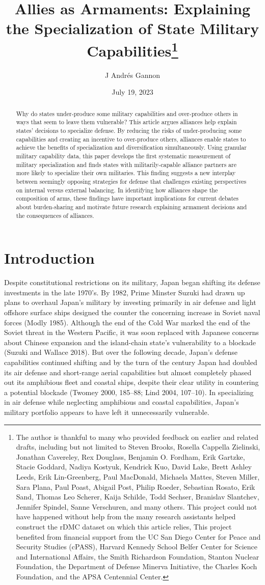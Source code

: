 \documentclass[
  12,
  letterpaper,
  DIV=11,
  numbers=noendperiod]{scrartcl}
\title{Allies as Armaments: Explaining the Specialization of State
Military Capabilities\thanks{The author is thankful to many who provided
feedback on earlier and related drafts, including but not limited to
Steven Brooks, Rosella Cappella Zielinski, Jonathan Cavereley, Rex
Douglass, Benjamin O. Fordham, Erik Gartzke, Stacie Goddard, Nadiya
Kostyuk, Kendrick Kuo, David Lake, Brett Ashley Leeds, Erik
Lin-Greenberg, Paul MacDonald, Michaela Mattes, Steven Miller, Sara
Plana, Paul Poast, Abigail Post, Philip Roeder, Sebastian Rosato, Erik
Sand, Thomas Leo Scherer, Kaija Schilde, Todd Sechser, Branislav
Slantchev, Jennifer Spindel, Sanne Verschuren, and many others. This
project could not have happened without help from the many research
assistants helped construct the rDMC dataset on which this article
relies, This project benefited from financial support from the UC San
Diego Center for Peace and Security Studies (cPASS), Harvard Kennedy
School Belfer Center for Science and International Affairs, the Smith
Richardson Foundation, Stanton Nuclear Foundation, the Department of
Defense Minerva Initiative, the Charles Koch Foundation, and the APSA
Centennial Center.}}
\author{J Andrés Gannon}
\date{July 19, 2023}
\begin{document}
\maketitle
\begin{abstract}
\singlespacing \noindent Why do states under-produce some military
capabilities and over-produce others in ways that seem to leave them
vulnerable? This article argues alliances help explain states' decisions
to specialize defense. By reducing the risks of under-producing some
capabilities and creating an incentive to over-produce others, alliances
enable states to achieve the benefits of specialization and
diversification simultaneously. Using granular military capability data,
this paper develops the first systematic measurement of military
specialization and finds states with militarily-capable alliance
partners are more likely to specialize their own militaries. This
finding suggests a new interplay between seemingly opposing strategies
for defense that challenges existing perspectives on internal versus
external balancing. In identifying how alliances shape the composition
of arms, these findings have important implications for current debates
about burden-sharing and motivate future research explaining armament
decisions and the consequences of alliances.
\end{abstract}
\ifdefined\Shaded\renewenvironment{Shaded}{\begin{tcolorbox}[borderline west={3pt}{0pt}{shadecolor}, boxrule=0pt, frame hidden, sharp corners, breakable, interior hidden, enhanced]}{\end{tcolorbox}}\fi

\newpage

\hypertarget{sec-intro}{%
\section{Introduction}\label{sec-intro}}

Despite constitutional restrictions on its military, Japan began
shifting its defense investments in the late 1970's. By 1982, Prime
Minster Suzuki had drawn up plans to overhaul Japan's military by
investing primarily in air defense and light offshore surface ships
designed the counter the concerning increase in Soviet naval forces
(Modly 1985). Although the end of the Cold War marked the end of the
Soviet threat in the Western Pacific, it was soon replaced with Japanese
concerns about Chinese expansion and the island-chain state's
vulnerability to a blockade (Suzuki and Wallace 2018). But over the
following decade, Japan's defense capabilities continued shifting and by
the turn of the century Japan had doubled its air defense and
short-range aerial capabilities but almost completely phased out its
amphibious fleet and coastal ships, despite their clear utility in
countering a potential blockade (Twomey 2000, 185--88; Lind 2004,
107--10). In specializing in air defense while neglecting amphibious and
coastal capabilities, Japan's military portfolio appears to have left it
unnecessarily vulnerable.
\end{document}
